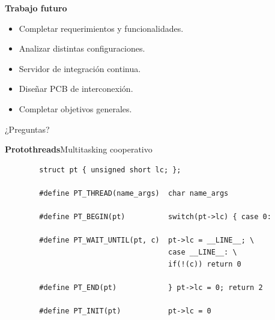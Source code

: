 \documentclass[11pt, xcolor={table,xcdraw}]{beamer}
\begin{document}
\begin{frame}{\textbf{\LARGE{Trabajo futuro}}}
\fontsize{18pt}{18}\selectfont
	\vspace{-.7cm}
	\centering
	\begin{itemize}
	\item Completar requerimientos y funcionalidades.
	\vspace{15px}
	\item Analizar distintas configuraciones.
	\vspace{15px}
	\item Servidor de integración continua.
	\vspace{15px}	
	\item Diseñar PCB de interconexión.
	\vspace{15px}	
	\item Completar objetivos generales.
	\end{itemize}
\end{frame}


\begin{frame}[plain,c]
\begin{center}
\Huge ¿Preguntas?
\end{center}

\end{frame}


\begin{frame}[fragile]{\textbf{\LARGE{Protothreads}}}{Multitasking cooperativo}
	\vspace{-.7cm}
	\begin{verbatim}
		struct pt { unsigned short lc; };
		
		#define PT_THREAD(name_args)  char name_args

		#define PT_BEGIN(pt)          switch(pt->lc) { case 0:

		#define PT_WAIT_UNTIL(pt, c)  pt->lc = __LINE__; \
		                              case __LINE__: \
		                              if(!(c)) return 0

		#define PT_END(pt)            } pt->lc = 0; return 2

		#define PT_INIT(pt)           pt->lc = 0
	\end{verbatim}
\end{frame}
\end{document}
